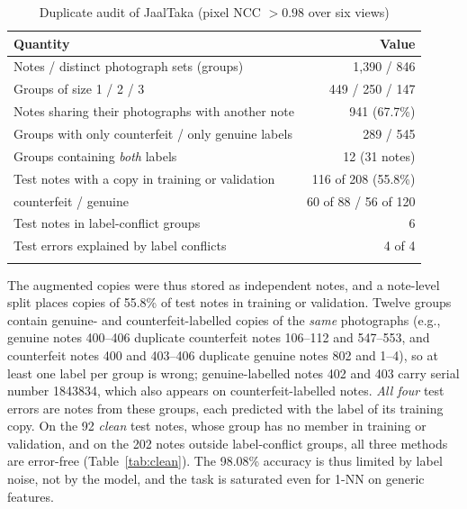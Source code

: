 \documentclass[pdflatex,sn-mathphys-num]{sn-jnl}
\begin{document}
\begin{table}[!t]
\caption{Duplicate audit of JaalTaka (pixel NCC $>0.98$ over six views)}\label{tab:audit}
\begin{tabular*}{\textwidth}{@{\extracolsep\fill}lr}
\toprule
Quantity & Value \\
\midrule
Notes / distinct photograph sets (groups) & 1{,}390 / 846 \\
Groups of size 1 / 2 / 3 & 449 / 250 / 147 \\
Notes sharing their photographs with another note & 941 (67.7\%) \\
Groups with only counterfeit / only genuine labels & 289 / 545 \\
Groups containing \emph{both} labels & 12 (31 notes) \\
\midrule
Test notes with a copy in training or validation & 116 of 208 (55.8\%) \\
\quad counterfeit / genuine & 60 of 88 / 56 of 120 \\
Test notes in label-conflict groups & 6 \\
Test errors explained by label conflicts & 4 of 4 \\
\botrule
\end{tabular*}
\end{table}

The augmented copies were thus stored as independent notes, and a note-level split
places copies of 55.8\% of test notes in training or validation. Twelve groups contain
genuine- and counterfeit-labelled copies of the \emph{same} photographs (e.g., genuine
notes 400--406 duplicate counterfeit notes 106--112 and 547--553, and counterfeit notes
400 and 403--406 duplicate genuine notes 802 and 1--4), so at least one label per group
is wrong; genuine-labelled notes 402 and 403 carry serial number 1843834, which also
appears on counterfeit-labelled notes. \emph{All four} test errors are notes from these
groups, each predicted with the label of its training copy. On the 92 \emph{clean} test
notes, whose group has no member in training or validation, and on the 202 notes outside
label-conflict groups, all three methods are error-free (Table~\ref{tab:clean}). The
98.08\% accuracy is thus limited by label noise, not by the model, and the task is
saturated even for 1-NN on generic features.
\end{document}
